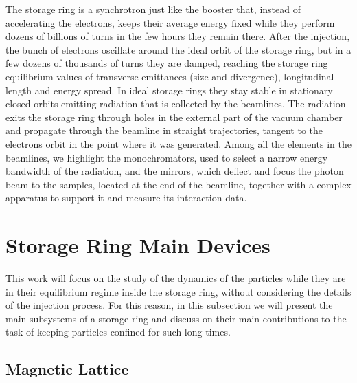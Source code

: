     The storage ring is a synchrotron just like the booster that, instead of accelerating the electrons, keeps their average energy fixed while they perform dozens of billions of turns in the few hours they remain there. After the injection, the bunch of electrons oscillate around the ideal orbit of the storage ring, but in a few dozens of thousands of turns they are damped, reaching the storage ring equilibrium values of transverse emittances (size and divergence), longitudinal length and energy spread. In ideal storage rings they stay stable in stationary closed orbits emitting radiation that is collected by the beamlines. The radiation exits the storage ring through holes in the external part of the vacuum chamber and propagate through the beamline in straight trajectories, tangent to the electrons orbit in the point where it was generated. Among all the elements in the beamlines, we highlight the monochromators, used to select a narrow energy bandwidth of the radiation, and the mirrors, which deflect and focus the photon beam to the samples, located at the end of the beamline, together with a complex apparatus to support it and measure its interaction data.

\section{Storage Ring Main Devices} \label{sec:storage_ring_main_devices}

    This work will focus on the study of the dynamics of the particles while they are in their equilibrium regime inside the storage ring, without considering the details of the injection process. For this reason, in this subsection we will present the main subsystems of a storage ring and discuss on their main contributions to the task of keeping particles confined for such long times.

\subsection{Magnetic Lattice}

